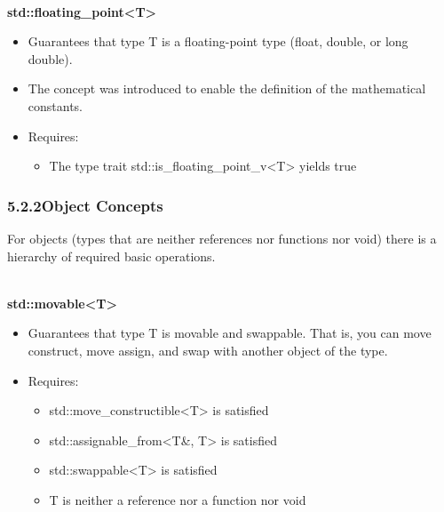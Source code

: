 \noindent
\hspace*{\fill} \\ %
\textbf{std::floating\_point<T>}

\begin{itemize}
\item
Guarantees that type T is a floating-point type (float, double, or long double).

\item
The concept was introduced to enable the definition of the mathematical constants.

\item
Requires:
\begin{itemize}
\item
The type trait std::is\_floating\_point\_v<T> yields true
\end{itemize}
\end{itemize}


\subsubsection*{ 5.2.2\hspace{0.2cm}Object Concepts}

For objects (types that are neither references nor functions nor void) there is a hierarchy of required basic operations.

\noindent
\hspace*{\fill} \\ %
\textbf{std::movable<T>}

\begin{itemize}
\item
Guarantees that type T is movable and swappable. That is, you can move construct, move assign, and swap with another object of the type.

\item
Requires:
\begin{itemize}
\item
std::move\_constructible<T> is satisfied

\item
std::assignable\_from<T\&, T> is satisfied

\item
std::swappable<T> is satisfied

\item
T is neither a reference nor a function nor void
\end{itemize}
\end{itemize}

